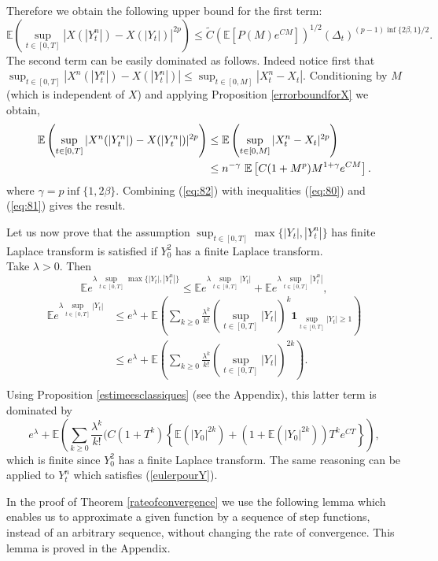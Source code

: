 \documentclass[a4paper, 11pt]{article}
\newcommand{\E}{\mathbb{E}}
\newcommand{\1}{\mathbf{1}}
\begin{document}
Therefore we obtain the following upper bound for the first term: 
\begin{equation}
\label{eq:80}
\E\left(\sup_{t\in[0,T]} |X(|Y_t^n|)-X(|Y_t|)|^{2p}\right)\leq \tilde C\left(\E\left[ P(M)e^{CM}\right] \right)^{1/2}(\Delta_t)^{(p-1)\inf \{2\beta,1\}/2}.
\end{equation}
The second term can be easily dominated as follows. Indeed notice first that $\sup_{t\in[0,T]} |X^n(|Y_t^n|)-X(|Y_t^n|)|\leq \sup_{t\in[0,M]} |X_t^n-X_t|$. Conditioning by $M$ (which is independent of $X$) and applying Proposition \ref{errorboundforX} we obtain,
\begin{align}
\E\left(\sup_{t\in[0,T]} |X^n(|Y_t^n|)-X(|Y_t^n|)|^{2p}\right)&\leq \E\left(\sup_{t\in[0,M]} |X_t^n-X_t|^{2p}\right)\notag \\
&\leq n^{-\gamma}\, \, \E \left[C(1+M^p)M^{1+\gamma} e^{CM}\right]. \label{eq:81}
\end{align}
where $\gamma=p\inf \{1,2\beta\}$. Combining (\ref{eq:82}) with inequalities (\ref{eq:80}) and (\ref{eq:81}) gives the result.


\noindent Let us now prove that the assumption $\sup_{t\in [0,T]} \max \{|Y_t|, |Y_t^n|\}$ has finite Laplace transform is satisfied if $Y_0^2$ has a finite Laplace transform.\\
\noindent Take $\lambda>0$. Then
$$\E e^{\lambda \sup_{t\in[0,T]} \max \{|Y_t|,|Y_t^n|\}}\leq \E e^{\lambda \sup_{t\in[0,T]} |Y_t|}+\E e^{\lambda \sup_{t\in[0,T]} |Y_t^n|},$$
\begin{align*}
\E e^{\lambda \sup_{t\in[0,T]} |Y_t|}&\leq e^\lambda +\E \left( \sum_{k\geq 0} \frac{\lambda^k}{k!}(\sup_{t\in [0,T]} |Y_t|)^k \1_{\sup_{t\in [0,T]} |Y_t|\geq 1}\right)\\
&\leq e^\lambda +\E \left( \sum_{k\geq 0} \frac{\lambda^k}{k!}(\sup_{t\in [0,T]} |Y_t|)^{2k}\right).\\
\end{align*}
Using Proposition \ref{estimeesclassiques}  (see the Appendix), this latter term is dominated by
$$e^\lambda +\E \left( \sum_{k\geq 0} \frac{\lambda^k}{k!}(C(1+T^k)\left\{\E(|Y_0|^{2k})+\left(1+\E(|Y_0|^{2k})\right)T^ke^{CT}\right\}\right),$$
which is finite since $Y_0^2$ has a finite Laplace transform. The same reasoning can be applied to $Y_t^n$ which satisfies (\ref{eulerpourY}).
\hfill \framebox[0.6em]{}


\bigskip





\noindent In the proof of Theorem \ref{rateofconvergence} we use the following lemma which enables us to approximate a given function by a sequence of step functions, instead of an arbitrary sequence, without changing the rate of convergence. This lemma is proved in the Appendix.
\end{document}
